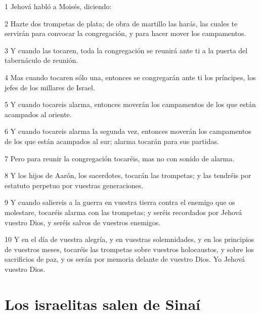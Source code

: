 \par 1 Jehová habló a Moisés, diciendo:
\par 2 Hazte dos trompetas de plata; de obra de martillo las harás, las cuales te servirán para convocar la congregación, y para hacer mover los campamentos.
\par 3 Y cuando las tocaren, toda la congregación se reunirá ante ti a la puerta del tabernáculo de reunión.
\par 4 Mas cuando tocaren sólo una, entonces se congregarán ante ti los príncipes, los jefes de los millares de Israel.
\par 5 Y cuando tocareis alarma, entonces moverán los campamentos de los que están acampados al oriente.
\par 6 Y cuando tocareis alarma la segunda vez, entonces moverán los campamentos de los que están acampados al sur; alarma tocarán para sus partidas.
\par 7 Pero para reunir la congregación tocaréis, mas no con sonido de alarma.
\par 8 Y los hijos de Aarón, los sacerdotes, tocarán las trompetas; y las tendréis por estatuto perpetuo por vuestras generaciones.
\par 9 Y cuando saliereis a la guerra en vuestra tierra contra el enemigo que os molestare, tocaréis alarma con las trompetas; y seréis recordados por Jehová vuestro Dios, y seréis salvos de vuestros enemigos.
\par 10 Y en el día de vuestra alegría, y en vuestras solemnidades, y en los principios de vuestros meses, tocaréis las trompetas sobre vuestros holocaustos, y sobre los sacrificios de paz, y os serán por memoria delante de vuestro Dios. Yo Jehová vuestro Dios.

\section*{Los israelitas salen de Sinaí}

